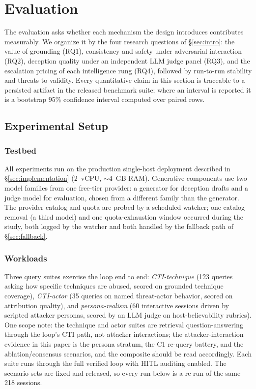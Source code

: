 \section{Evaluation}
\label{sec:evaluation}



The evaluation asks whether each mechanism the design introduces
contributes measurably. We organize it by the four research questions of
\S\ref{sec:intro}: the value of grounding (RQ1), consistency and safety
under adversarial interaction (RQ2), deception quality under an
independent LLM judge panel (RQ3), and the escalation pricing of each
intelligence rung (RQ4), followed by run-to-run stability and threats to
validity. Every quantitative claim in this section is traceable to a
persisted artifact in the released benchmark suite; where an interval is
reported it is a bootstrap 95\% confidence interval computed over paired
rows.

\subsection{Experimental Setup}
\label{sec:setup}

\subsubsection{Testbed}
All experiments run on the production single-host deployment described in
\S\ref{sec:implementation} (2~vCPU, ${\sim}4$~GB RAM). Generative
components use two model families from one free-tier provider: a generator
for deception drafts and a judge model for evaluation, chosen from a
different family than the generator. The provider catalog and quota are
probed by a scheduled watcher; one catalog removal (a third model) and one
quota-exhaustion window occurred during the study, both logged by the
watcher and both handled by the fallback path of \S\ref{sec:fallback}.

\subsubsection{Workloads}
Three query suites exercise the loop end to end:
\emph{CTI-technique} (123 queries asking how specific \attck techniques
are abused, scored on grounded technique coverage),
\emph{CTI-actor} (35 queries on named threat-actor behavior, scored on
attribution quality), and \emph{persona-realism} (60 interactive sessions
driven by scripted attacker personas, scored by an LLM judge on
host-believability rubrics). One scope note: the technique and actor
suites are retrieval question-answering through the loop's CTI path,
not attacker interactions; the attacker-interaction evidence in this
paper is the persona stratum, the C1 re-query battery, and the
ablation/consensus scenarios, and the composite should be read
accordingly. Each suite runs through the full verified
loop with HITL auditing enabled. The scenario sets are fixed and released,
so every run below is a re-run of the same 218 sessions.

